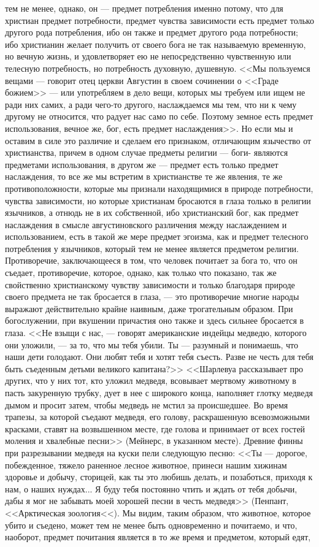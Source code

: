 \documentclass[12pt]{article}
\begin{document}
тем не менее, однако, он --- предмет потребления именно потому, что для христиан предмет потребности, предмет чувства зависимости есть предмет только другого рода потребления, ибо он также и предмет другого рода потребности; ибо христианин желает получить от своего бога не так называемую временную, но вечную жизнь, и удовлетворяет ею не непосредственно чувственную или телесную потребность, но потребность духовную, душевную. <<Мы пользуемся вещами --- говорит отец церкви Августин в своем сочинении о <<Граде божием>>  --- или употребляем в дело вещи, которых мы требуем или ищем не ради них самих, а ради чего-то другого, наслаждаемся мы тем, что ни к чему другому не относится, что радует нас само по себе. Поэтому земное есть предмет использования, вечное же, бог, есть предмет наслаждения>>. Но если мы и оставим в силе это различие и сделаем его признаком, отличающим язычество от христианства, причем в одном случае предметы религии --- боги- являются предметами использования, в другом же --- предмет есть только предмет наслаждения, то все же мы встретим в христианстве те же явления, те же противоположности, которые мы признали находящимися в природе потребности, чувства зависимости, но которые христианам бросаются в глаза только в религии язычников, а отнюдь не в их собственной, ибо христианский бог, как предмет наслаждения в смысле августиновского различения между наслаждением и использованием, есть в такой же мере предмет эгоизма, как и предмет телесного потребления у язычников, который тем не менее является предметом религии. Противоречие, заключающееся в том, что человек почитает за бога то, что он съедает, противоречие, которое, однако, как только что показано, так же свойственно христианскому чувству зависимости и только благодаря природе своего предмета не так бросается в глаза, --- это противоречие многие народы выражают действительно крайне наивным, даже трогательным образом. При богослужении, при вкушении причастия оно также и здесь сильнее бросается в глаза. <<Не взыщи с нас, --- говорят американские индейцы медведю, которого они уложили, --- за то, что мы тебя убили. Ты --- разумный и понимаешь, что наши дети голодают. Они любят тебя и хотят тебя съесть. Разве не честь для тебя быть съеденным детьми великого капитана?>> <<Шарлевуа рассказывает про других, что у них тот, кто уложил медведя, всовывает мертвому животному в пасть закуренную трубку, дует в нее с широкого конца, наполняет глотку медведя дымом и просит затем, чтобы медведь не мстил за происшедшее. Во время трапезы, за которой съедают медведя, его голову, раскрашенную всевозможными красками, ставят на возвышенном месте, где голова и принимает от всех гостей моления и хвалебные песни>> (Мейнерс, в указанном месте). Древние финны при разрезывании медведя на куски пели следующую песню: <<Ты --- дорогое, побежденное, тяжело раненное лесное животное, принеси нашим хижинам здоровье и добычу, сторицей, как ты это любишь делать, и позаботься, приходя к нам, о наших нуждах... Я буду тебя постоянно чтить и ждать от тебя добычи, дабы я мог не забывать моей хорошей песни в честь медведя>> (Пенпант, <<Арктическая зоология<<). Мы видим, таким образом, что животное, которое убито и съедено, может тем не менее быть одновременно и почитаемо, и что, наоборот, предмет почитания является в то же время и предметом, который едят, 
\end{document}

